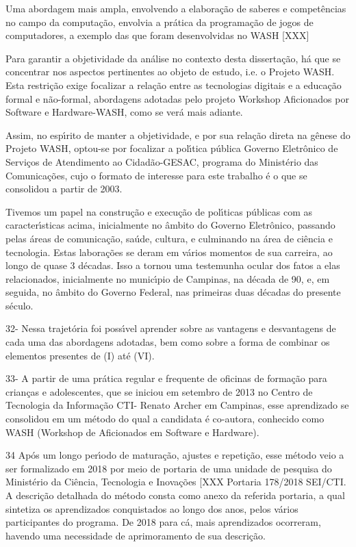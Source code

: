\documentclass[
12pt,		%
openright,	%
twoside,  %
a4paper,			%
chapter=TITLE,		%
english,			%
french,				%
spanish,			%
brazil				%
]{USPSC-classe/USPSC}
\begin{document}
Uma abordagem mais ampla, envolvendo a elabora\c{c}\~ao de saberes e compet\^encias no campo da computa\c{c}\~ao, envolvia a pr\'atica da programa\c{c}\~ao de jogos de computadores, a exemplo das que foram desenvolvidas no WASH [XXX]


Para garantir a objetividade da an\'alise no contexto desta disserta\c{c}\~ao, h\'a que se concentrar nos aspectos pertinentes ao objeto de estudo, i.e. o Projeto WASH. Esta restri\c{c}\~ao exige focalizar a rela\c{c}\~ao entre as tecnologias digitais e a educa\c{c}\~ao formal e n\~ao-formal, abordagens adotadas pelo projeto Workshop Aficionados por Software e Hardware-WASH, como se ver\'a mais adiante.


Assim, no esp\'{\i}rito de manter a objetividade, e por sua rela\c{c}\~ao direta na g\^enese do Projeto WASH, optou-se por focalizar a pol\'{\i}tica p\'ublica \textquotedbl Governo Eletr\^onico de Servi\c{c}os de Atendimento ao Cidad\~ao-GESAC, programa do  Minist\'erio das Comunica\c{c}\~oes, cujo o formato de interesse para este trabalho \'e o que se consolidou a partir de 2003.


Tivemos um papel na constru\c{c}\~ao e execu\c{c}\~ao de pol\'{\i}ticas p\'ublicas com as caracter\'{\i}sticas acima, inicialmente no \^ambito do Governo Eletr\^onico, passando pelas \'areas de comunica\c{c}\~ao, sa\'ude, cultura, e culminando na \'area de ci\^encia e tecnologia. Estas labora\c{c}\~oes  se deram em v\'arios momentos de sua carreira, ao longo de quase 3 d\'ecadas. Isso a tornou uma testemunha ocular dos fatos a elas relacionados, inicialmente no  munic\'{\i}pio de Campinas, na d\'ecada de 90, e, em seguida, no \^ambito do Governo Federal, nas primeiras duas d\'ecadas do presente s\'eculo.


32- Nessa trajet\'oria foi poss\'{\i}vel aprender sobre as vantagens e desvantagens de cada uma das abordagens adotadas, bem como sobre a forma de combinar os elementos presentes de (I) at\'e (VI).


33- A partir de uma pr\'atica regular e frequente de oficinas de forma\c{c}\~ao para  crian\c{c}as e adolescentes, que se iniciou em setembro de 2013 no Centro de Tecnologia da Informa\c{c}\~ao CTI- Renato Archer em Campinas, esse aprendizado se consolidou em um m\'etodo do qual a candidata \'e co-autora, conhecido como WASH (Workshop de Aficionados em Software e Hardware).


34 Ap\'os um longo per\'{\i}odo de matura\c{c}\~ao, ajustes e repeti\c{c}\~ao, esse m\'etodo veio a ser formalizado em 2018 por meio de portaria de uma unidade de pesquisa do Minist\'erio da Ci\^encia, Tecnologia e Inova\c{c}\~oes [XXX Portaria 178/2018 SEI/CTI. A descri\c{c}\~ao detalhada do m\'etodo consta como anexo da referida portaria, a qual sintetiza os aprendizados conquistados ao longo dos anos, pelos v\'arios participantes do programa. De 2018 para c\'a, mais aprendizados ocorreram, havendo uma necessidade de aprimoramento de sua descri\c{c}\~ao.
\end{document}
